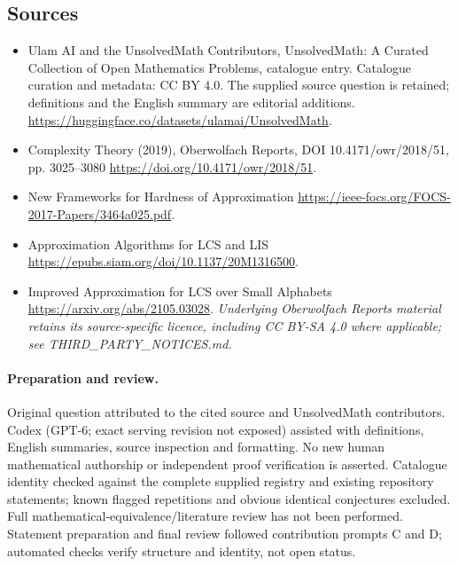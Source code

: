 \documentclass[11pt]{article}
\begin{document}
\subsection{Sources}
\begin{itemize}
\item[\hypertarget{source:statement:1}{S1}] Ulam AI and the UnsolvedMath Contributors, UnsolvedMath: A Curated Collection of Open Mathematics Problems, catalogue entry. Catalogue curation and metadata: CC BY 4.0. The supplied source question is retained; definitions and the English summary are editorial additions.
\url{https://huggingface.co/datasets/ulamai/UnsolvedMath}.
\item[\hypertarget{source:statement:2}{S2}] Complexity Theory (2019), Oberwolfach Reports, DOI 10.4171/owr/2018/51, pp. 3025--3080
\url{https://doi.org/10.4171/owr/2018/51}.
\item[\hypertarget{source:statement:3}{S3}] New Frameworks for Hardness of Approximation
\url{https://ieee-focs.org/FOCS-2017-Papers/3464a025.pdf}.
\item[\hypertarget{source:statement:4}{S4}] Approximation Algorithms for LCS and LIS
\url{https://epubs.siam.org/doi/10.1137/20M1316500}.
\item[\hypertarget{source:statement:5}{S5}] Improved Approximation for LCS over Small Alphabets
\url{https://arxiv.org/abs/2105.03028}.
\textit{Underlying Oberwolfach Reports material retains its source-specific licence, including CC BY-SA 4.0 where applicable; see THIRD\_PARTY\_NOTICES.md.}
\end{itemize}
\paragraph{Preparation and review.}
Original question attributed to the cited source and UnsolvedMath contributors. Codex (GPT-6; exact serving revision not exposed) assisted with definitions, English summaries, source inspection and formatting. No new human mathematical authorship or independent proof verification is asserted. Catalogue identity checked against the complete supplied registry and existing repository statements; known flagged repetitions and obvious identical conjectures excluded. Full mathematical-equivalence/literature review has not been performed. Statement preparation and final review followed contribution prompts C and D; automated checks verify structure and identity, not open status.
\label{end:statement}
\end{document}
